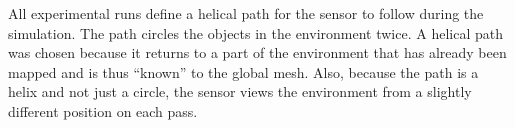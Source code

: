 All experimental runs define a helical path for the sensor to follow during the
simulation. The path circles the objects in the environment twice. A helical
path was chosen because it returns to a part of the environment that has already
been mapped and is thus ``known'' to the global mesh. Also, because the path is
a helix and not just a circle, the sensor views the environment from a slightly
different position on each pass.
